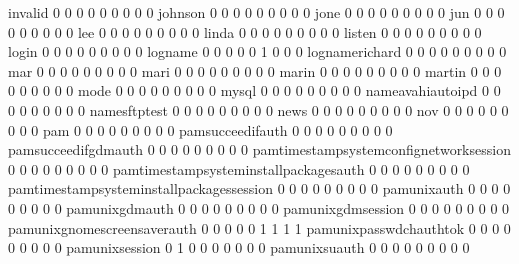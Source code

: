 \documentclass[compress,8pt]{beamer}
\begin{document}
\begin{frame}
\begin{Schunk}
  invalid                                    0   0   0   0   0   0   0   0   0
  johnson                                    0   0   0   0   0   0   0   0   0
  jone                                       0   0   0   0   0   0   0   0   0
  jun                                        0   0   0   0   0   0   0   0   0
  lee                                        0   0   0   0   0   0   0   0   0
  linda                                      0   0   0   0   0   0   0   0   0
  listen                                     0   0   0   0   0   0   0   0   0
  login                                      0   0   0   0   0   0   0   0   0
  logname                                    0   0   0   0   0   1   0   0   0
  lognamerichard                             0   0   0   0   0   0   0   0   0
  mar                                        0   0   0   0   0   0   0   0   0
  mari                                       0   0   0   0   0   0   0   0   0
  marin                                      0   0   0   0   0   0   0   0   0
  martin                                     0   0   0   0   0   0   0   0   0
  mode                                       0   0   0   0   0   0   0   0   0
  mysql                                      0   0   0   0   0   0   0   0   0
  nameavahiautoipd                           0   0   0   0   0   0   0   0   0
  namesftptest                               0   0   0   0   0   0   0   0   0
  news                                       0   0   0   0   0   0   0   0   0
  nov                                        0   0   0   0   0   0   0   0   0
  pam                                        0   0   0   0   0   0   0   0   0
  pamsucceedifauth                           0   0   0   0   0   0   0   0   0
  pamsucceedifgdmauth                        0   0   0   0   0   0   0   0   0
  pamtimestampsystemconfignetworksession     0   0   0   0   0   0   0   0   0
  pamtimestampsysteminstallpackagesauth      0   0   0   0   0   0   0   0   0
  pamtimestampsysteminstallpackagessession   0   0   0   0   0   0   0   0   0
  pamunixauth                                0   0   0   0   0   0   0   0   0
  pamunixgdmauth                             0   0   0   0   0   0   0   0   0
  pamunixgdmsession                          0   0   0   0   0   0   0   0   0
  pamunixgnomescreensaverauth                0   0   0   0   0   1   1   1   1
  pamunixpasswdchauthtok                     0   0   0   0   0   0   0   0   0
  pamunixsession                             0   1   0   0   0   0   0   0   0
  pamunixsuauth                              0   0   0   0   0   0   0   0   0

\end{Schunk}
\end{frame}
\end{document}
